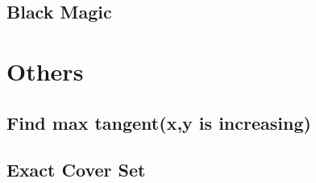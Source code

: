 \documentclass[a4paper,10pt,twocolumn,oneside]{article}
\begin{document}
%

%

\subsection{Black Magic}


\section{Others}

\subsection{Find max tangent(x,y is increasing)}


\subsection{Exact Cover Set}


%


\end{document}
